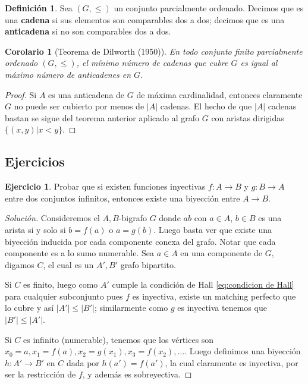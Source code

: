 \documentclass[12pt]{report}
\theoremstyle{plain}
\newtheorem{corollary}[theorem]{Corolario}
\theoremstyle{definition}
\newtheorem{definition}[theorem]{Definición}
\newtheorem{exercise}[theorem]{Ejercicio}
\newenvironment{solution}{\begin{proof}[Solución]}{\end{proof}}
\newcommand{\abs}[1]{\left \vert #1 \right \vert}
\begin{document}
\begin{definition}
Sea $(G, \leq)$ un conjunto parcialmente ordenado. Decimos que es una \textbf{cadena} si sus elementos son comparables dos a dos; decimos que es una \textbf{anticadena} si no son comparables dos a dos.
\end{definition}

\begin{corollary}[Teorema de Dilworth (1950)]\label{corolario:teorema de Dilworth}
En todo conjunto finito parcialmente ordenado $(G, \leq)$, el mínimo número de cadenas que cubre $G$ es igual al máximo número de anticadenes en $G$.
\end{corollary}
\begin{proof}
Si $A$ es una anticadena de $G$ de máxima cardinalidad, entonces claramente $G$ no puede ser cubierto por menos de $\abs A$ cadenas. El hecho de que $\abs A$ cadenas bastan se sigue del teorema anterior aplicado al grafo $G$ con aristas dirigidas $\{(x,y) | x < y \}$.
\end{proof}






\subsection{Ejercicios}

\begin{exercise}
Probar que si existen funciones inyectivas $f: A \rightarrow B$ y $g : B \rightarrow A$ entre dos conjuntos infinitos, entonces existe una biyección entre $A \rightarrow B$.
\end{exercise}
\begin{solution}
Consideremos el $A,B$-bigrafo $G$ donde $ab$ con $a \in A$, $b \in B$ es una arista si y solo si $b = f(a)$ o $a = g(b)$. Luego basta ver que existe una biyección inducida por cada componente conexa del grafo. Notar que cada componente es a lo sumo numerable. Sea $a \in A$ en una componente de $G$, digamos $C$, el cual es un $A',B'$ grafo bipartito.

Si $C$ es finito, luego como $A'$ cumple la condición de Hall \ref{eq:condicion de Hall} para cualquier subconjunto pues $f$ es inyectiva, existe un matching perfecto que lo cubre y así $\abs {A'} \leq \abs{B'}$; similarmente como $g$ es inyectiva tenemos que $\abs {B'} \leq \abs {A'}$.

Si $C$ es infinito (numerable), tenemos que los vértices son $x_0 = a, x_1 = f(a), x_2 = g(x_1), x_3 = f(x_2), \ldots $. Luego definimos una biyección $h: A' \rightarrow B'$ en $C$ dada por
$h(a') = f(a')$, la cual claramente es inyectiva, por ser la restricción de $f$, y además es sobreyectiva.
\end{solution}
\end{document}
